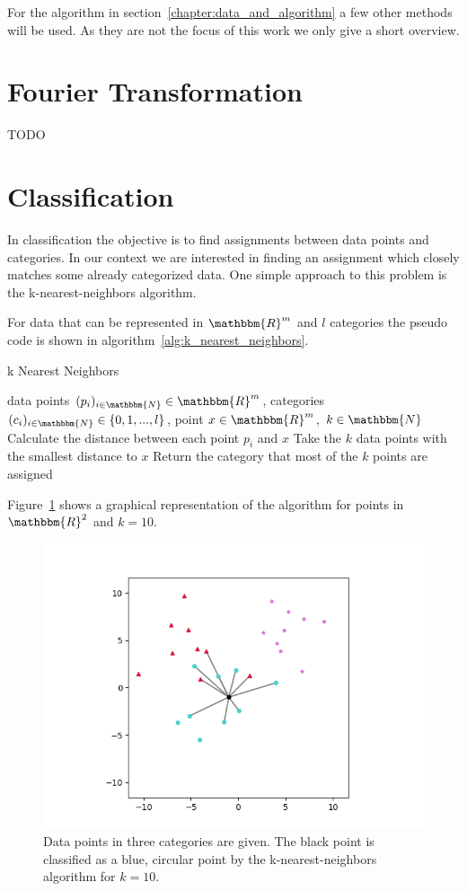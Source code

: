 For the algorithm in section~\ref{chapter:data_and_algorithm} a few other methods will be used. As they are not the focus of this work we only give a short overview.

\section{Fourier Transformation}
\label{sec:fourier_transformation}

TODO

\section{Classification}
\label{sec:classification}

In classification the objective is to find assignments between data points and categories. In our context we are interested in finding an assignment which closely matches some already categorized data. One simple approach to this problem is the k-nearest-neighbors algorithm.

For data that can be represented in $\mathbbm{R}^m$ and $l$ categories the pseudo code is shown in algorithm~\ref{alg:k_nearest_neighbors}.

\begin{algorithm}
	\caption{k Nearest Neighbors}\label{alg:k_nearest_neighbors}
	\begin{algorithmic}
		\Require data points $(p_i)_{i \in \mathbbm{N}} \in \mathbbm{R}^{m}$, categories $(c_i)_{i \in \mathbbm{N}} \in \{0, 1, ..., l\}$, point $x \in \mathbbm{R}^{m}$, $k \in \mathbbm{N}$
		\State Calculate the distance between each point $p_i$ and $x$
		\State Take the $k$ data points with the smallest distance to $x$
		\State Return the category that most of the $k$ points are assigned
	\end{algorithmic}
\end{algorithm}

Figure~\ref{fig:k_nearest_neighbors} shows a graphical representation of the algorithm for points in $\mathbbm{R}^2$ and $k=10$.

\begin{figure}
	\centering
	\includegraphics[width=0.8\linewidth]{figs/k_nearest_neighbors}
	\caption{Data points in three categories are given. The black point is classified as a blue, circular point by the k-nearest-neighbors algorithm for $k=10$.}
	\label{fig:k_nearest_neighbors}
\end{figure}

